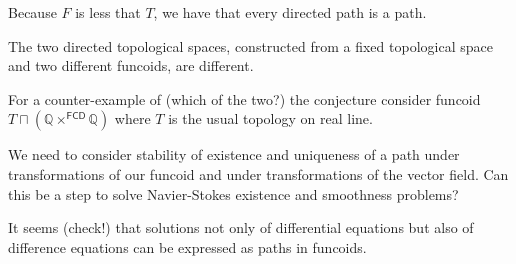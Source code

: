 Because $F$ is less that $T$, we have that every directed path is a path.

\begin{conjecture}
The two directed topological spaces, constructed from a fixed topological space and two different funcoids,
are different.
\end{conjecture}

For a counter-example of (which of the two?) the conjecture consider funcoid $T\sqcap(\mathbb{Q}\times^{\mathsf{FCD}}\mathbb{Q})$
where $T$ is the usual topology on real line.

We need to consider stability of existence and uniqueness of a path under transformations of our funcoid and
under transformations of the vector field. Can this be a step to solve Navier-Stokes existence and smoothness problems?

It seems (check!) that solutions not only of differential equations but also of difference equations can be
expressed as paths in funcoids.